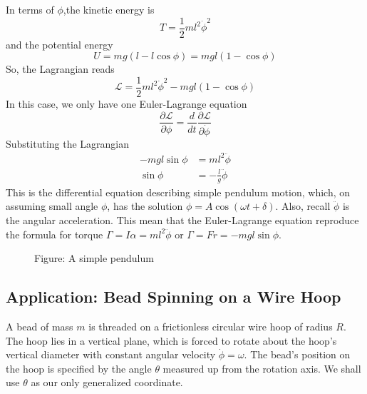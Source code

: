 \documentclass[../../../main.tex]{subfiles}
\begin{document}
In terms of $\phi$,the kinetic energy is 
\begin{equation*}
    T=\frac{1}{2}ml^2\dot{\phi}^2
\end{equation*}
and the potential energy 
\begin{equation*}
    U=mg(l-l\cos\phi)=mgl(1-\cos\phi)
\end{equation*}
So, the Lagrangian reads
\begin{equation*}
    \mathcal{L}=\frac{1}{2}ml^2\dot{\phi}^2-mgl(1-\cos\phi)
\end{equation*}
In this case, we only have one Euler-Lagrange equation
\begin{equation*}
    \frac{\partial\mathcal{L}}{\partial \phi}=\frac{d}{dt}\frac{\partial\mathcal{L}}{\partial \dot{\phi}}
\end{equation*}
Substituting the Lagrangian
\begin{align*}
    -mgl\sin\phi&=ml^2\ddot{\phi}\\
    \sin\phi&=-\frac{l}{g}\ddot{\phi}
\end{align*}
This is the differential equation describing simple pendulum motion, which, on assuming small angle $\phi$, has the solution $\phi=A\cos(\omega t+\delta)$. 
Also, recall $\ddot{\phi}$ is the angular acceleration. 
This mean that the Euler-Lagrange equation reproduce the formula for torque $\Gamma=I\alpha=ml^2\ddot{\phi}$ or $\Gamma=Fr=-mgl\sin\phi$. 

\begin{figure*}
	\centering
	\caption*{Figure: A simple pendulum}
\end{figure*}

\subsection*{Application: Bead Spinning on a Wire Hoop}
A bead of mass $m$ is threaded on a frictionless circular wire hoop of radius $R$.
The hoop lies in a vertical plane, which is forced to rotate about the hoop's vertical diameter with constant angular velocity $\dot{\phi} =\omega$.
The bead's position on the hoop is specified by the angle $\theta$ measured up from the rotation axis.
We shall use $\theta$ as our only generalized coordinate.
\end{document}
